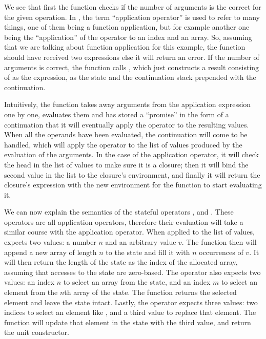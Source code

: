 We see that first the function checks if the number of arguments is the correct
for the given operation. In \StateLang{}, the term ``application operator'' is
used to refer to many things, one of them being a function application, but for
example another one being the ``application'' of the  operator to an
index and an array. So, assuming that we are talking about function application
for this example, the  function should have received two expressions
else it will return an error. If the number of arguments is correct, the
function calls , which just constructs a result consisting of 
as the expression,  as the state and the continuation stack 
prepended with the  continuation.

Intuitively, the  function takes away arguments from the application
expression one by one, evaluates them and has stored a ``promise'' in the form
of a continuation that it will eventually apply the operator to the resulting
values. When all the operands have been evaluated, the  continuation
will come to be handled, which will apply the operator to the list of values
produced by the evaluation of the arguments. In the case of the application
operator, it will check the head in the list of values to make sure it is a
closure; then it will bind the second value in the list to the closure's
environment, and finally it will return the closure's expression with the new
environment for the  function to start evaluating it.

We can now explain the semantics of the stateful operators ,
 and . These operators are all application operators,
therefore their evaluation will take a similar course with the application
operator. When applied to the list of values,  expects two values: a
number $n$ and an arbitrary value $v$. The  function then will
append a new array of length $n$ to the state and fill it with $n$ occurrences
of $v$. It will then return the length of the state as the index of the
allocated array, assuming that accesses to the state are zero-based. The
 operator also expects two values: an index $n$ to select an array from
the state, and an index $m$ to select an element from the $n$th array of the
state. The  function returns the selected element and leave the
state intact. Lastly, the  operator expects three values: two
indices to select an element like , and a third value to replace that
element. The  function will update that element in the state
with the third value, and return the unit constructor.

